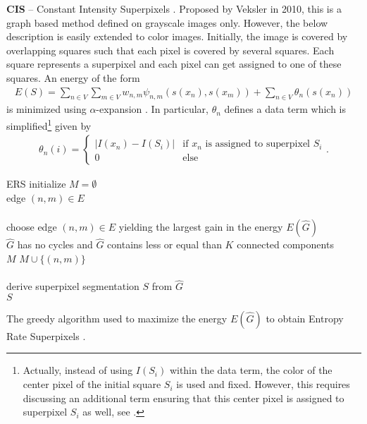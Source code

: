 \textbf{CIS} -- Constant Intensity Superpixels \cite{VekslerBoykovMehrani:2010}. Proposed by Veksler \etal in 2010, this is a graph based method defined on grayscale images only. However, the below description is easily extended to color images. Initially, the image is covered by overlapping squares such that each pixel is covered by several squares. Each square represents a superpixel and each pixel can get assigned to one of these squares. An energy of the form
\begin{align}
	\label{eq:related-work-cis-energy}
	E(S) = \sum_{n \in V} \sum_{m \in V} w_{n,m} \psi_{n,m}(s(x_n), s(x_m)) + \sum_{n \in V} \theta_n(s(x_n))
\end{align}
is minimized using $\alpha$-expansion \cite{BoykovVekslerZabih:2001}. In particular, $\theta_n$ defines a data term which is simplified\footnote{Actually, instead of using $I(S_i)$ within the data term, the color of the center pixel of the initial square $S_i$ is used and fixed. However, this requires discussing an additional term ensuring that this center pixel is assigned to superpixel $S_i$ as well, see \cite{VekslerBoykovMehrani:2010}.} given by
\begin{align}
	\label{eq:related-work-cis-data-term}
	\theta_n(i) = \begin{cases}
		|I(x_n) - I(S_i)| & \text{if } x_n \text{ is assigned to superpixel } S_i\\
		0 & \text{else}
	\end{cases}.
\end{align}
\begin{algorithm}[t]
	\begin{algo}{ERS}{\label{algo:related-work-ers}}
		initialize $M = \emptyset$\\
		\qforeach edge $(n,m) \in E$\\
			\\
			choose edge $(n,m) \in E$ yielding the largest gain in the energy $E(\hat{G})$\\
			\qif $\hat{G}$ has no cycles and $\hat{G}$ contains less or equal than $K$ connected components\\
				\qthen $M$ \qlet $M \cup \{(n,m)\}$\qfi\qrof\\
		\\
		derive superpixel segmentation $S$ from $\hat{G}$\\
		\qreturn $S$
	\end{algo}
	\caption{The greedy algorithm used to maximize the energy $E(\hat{G})$ to obtain Entropy Rate Superpixels \cite{LiuTuzelRamalingamChellappa:2011}.}
	\label{fig:related-work-ers-algorithm}
\end{algorithm}

